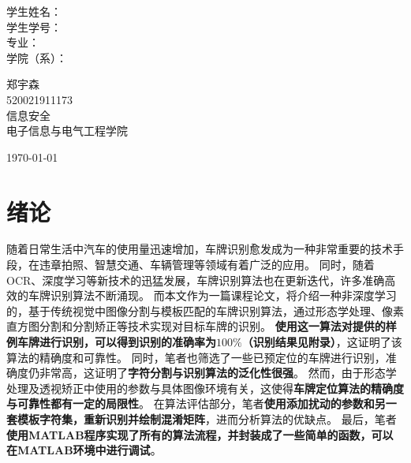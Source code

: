 \documentclass[utf8,a4paper]{ctexart}
\begin{document}
\begin{titlepage}
\begin{center}
        \begin{minipage}{0.2\textwidth}
            \begin{flushright} \large\kaishu
                学生姓名： \\
                学生学号： \\
                专\qquad 业： \\
                学院（系）： \\
            \end{flushright}
        \end{minipage}
        \begin{minipage}{0.4\textwidth}
            \begin{flushleft} \large\kaishu
                \centering 郑宇森\\
                520021911173\\
                信息安全\\
                电子信息与电气工程学院
            \end{flushleft}
        \end{minipage}
        \vfill
        {\large \today}

    \end{center}

\end{titlepage}

\tableofcontents

\newpage

\section{绪论}
随着日常生活中汽车的使用量迅速增加，车牌识别愈发成为一种非常重要的技术手段，在违章拍照、智慧交通、车辆管理等领域有着广泛的应用。
同时，随着OCR、深度学习等新技术的迅猛发展，车牌识别算法也在更新迭代，许多准确高效的车牌识别算法不断涌现。
而本文作为一篇课程论文，将介绍一种非深度学习的，基于传统视觉中图像分割与模板匹配的车牌识别算法，通过形态学处理、像素直方图分割和分割矫正等技术实现对目标车牌的识别。
\textbf{使用这一算法对提供的样例车牌进行识别，可以得到识别的准确率为$100\%$（识别结果见附录）}，这证明了该算法的精确度和可靠性。
同时，笔者也筛选了一些已预定位的车牌进行识别，准确度仍非常高，这证明了\textbf{字符分割与识别算法的泛化性很强}。
然而，由于形态学处理及透视矫正中使用的参数与具体图像环境有关，这使得\textbf{车牌定位算法的精确度与可靠性都有一定的局限性}。
在算法评估部分，笔者\textbf{使用添加扰动的参数和另一套模板字符集，重新识别并绘制混淆矩阵}，进而分析算法的优缺点。
最后，笔者\textbf{使用MATLAB程序实现了所有的算法流程，并封装成了一些简单的函数，可以在MATLAB环境中进行调试}。
\end{document}
